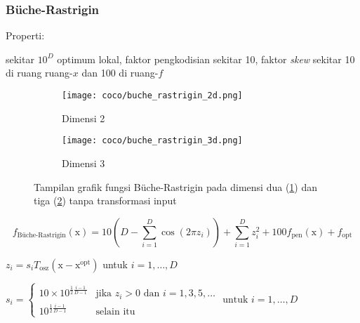 \subsubsection{Büche-Rastrigin}
\noindent Properti:
\begin{packed_item}
  \item sekitar $10^D$ optimum lokal, faktor pengkodisian sekitar 10, faktor \textit{skew} sekitar 10 di ruang ruang-$x$ dan 100 di ruang-$f$ 
\end{packed_item}
\begin{figure}[H]
	\centering
	\begin{subfigure}[b]{0.4\textwidth}
		\centering
		\texttt{[image: coco/buche\_rastrigin\_2d.png]}
		\caption{Dimensi 2}
		\label{fig:buche-rastrigin-2d}
	\end{subfigure}
	\hfill
	\begin{subfigure}[b]{0.4\textwidth}
		\centering
		\texttt{[image: coco/buche\_rastrigin\_3d.png]}
		\caption{Dimensi 3}
		\label{fig:buche-rastrigin-3d}
	\end{subfigure}
	\caption{Tampilan grafik fungsi Büche-Rastrigin pada dimensi dua (\cref{fig:buche-rastrigin-2d}) dan tiga (\cref{fig:buche-rastrigin-3d}) tanpa transformasi input}
	\label{fig:buche_rastrigin}
\end{figure}
\begin{equation}
  f_{\text{Büche-Rastrigin}}(\mathrm{x})=10(D-\sum_{i=1}^{D}\cos(2\pi z_i))+\sum_{i=1}^{D}z_i^2+100f_{\text{pen}}(\mathrm{x})+f_{\text{opt}}
\end{equation}
\begin{packed_item}
    \item $z_i=s_iT_{\text{osz}}(\mathrm{x}-\mathrm{x}^{\text{opt}})$ untuk $i=1,\ldots,D$
    \item $s_i=\begin{cases}
      10\times 10^{\frac{1}{2}\frac{i-1}{D-1}} & \text{jika }z_i > 0 \text{ dan } i=1,3,5,\ldots\\
      10^{\frac{1}{2}\frac{i-1}{D-1}} & \text{selain itu}
    \end{cases} \text{ untuk }i=1,\ldots,D$
\end{packed_item}

